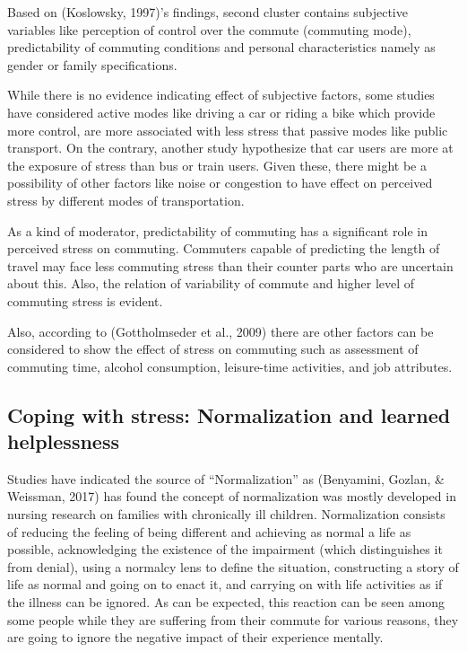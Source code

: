 \documentclass[
11pt, %
oneside, %
english, %
singlespacing, %
]{macthesis} %
\begin{document}
Based on (Koslowsky, 1997)'s findings, second cluster contains subjective variables like perception of control over the commute (commuting mode), predictability of commuting conditions and personal characteristics namely as gender or family specifications.

While there is no evidence indicating effect of subjective factors, some studies have considered active modes like driving a car or riding a bike which provide more control, are more associated with less stress that passive modes like public transport. On the contrary, another study hypothesize that car users are more at the exposure of stress than bus or train users. Given these, there might be a possibility of other factors like noise or congestion to have effect on perceived stress by different modes of transportation.

As a kind of moderator, predictability of commuting has a significant role in perceived stress on commuting. Commuters capable of predicting the length of travel may face less commuting stress than their counter parts who are uncertain about this. Also, the relation of variability of commute and higher level of commuting stress is evident.

Also, according to (Gottholmseder et al., 2009) there are other factors can be considered to show the effect of stress on commuting such as assessment of commuting time, alcohol consumption, leisure-time activities, and job attributes.

\hypertarget{coping-with-stress-normalization-and-learned-helplessness}{%
\subsection{Coping with stress: Normalization and learned helplessness}\label{coping-with-stress-normalization-and-learned-helplessness}}

Studies have indicated the source of ``Normalization'' as (Benyamini, Gozlan, \& Weissman, 2017) has found the concept of normalization was mostly developed in nursing research on families with chronically ill children. Normalization consists of reducing the feeling of being different and achieving as normal a life as possible, acknowledging the existence of the impairment (which distinguishes it from denial), using a normalcy lens to define the situation, constructing a story of life as normal and going on to enact it, and carrying on with life activities as if the illness can be ignored. As can be expected, this reaction can be seen among some people while they are suffering from their commute for various reasons, they are going to ignore the negative impact of their experience mentally.
\end{document}
